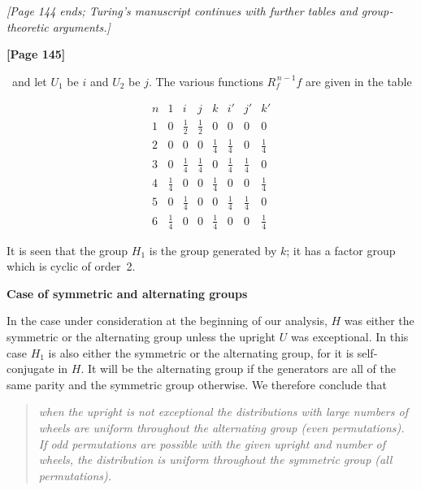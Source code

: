 \documentclass[12pt]{article}
\begin{document}
\bigskip
\noindent
{\em [Page 144 ends; Turing's manuscript continues with further tables and group‐theoretic arguments.]}


\bigskip
\noindent
{\bf [Page 145]}

\medskip

\noindent
\textellipsis\ and let $U_1$ be $i$ and $U_2$ be $j$. The various functions $R_f^{\,n-1}f$ are given in the table

\[
\begin{array}{c|ccccccc}
n & 1 & i & j & k & i' & j' & k' \\ \hline
1 & 0 & \tfrac12 & \tfrac12 & 0 & 0 & 0 & 0 \\
2 & 0 & 0 & 0 & \tfrac14 & \tfrac14 & 0 & \tfrac14 \\
3 & 0 & \tfrac14 & \tfrac14 & 0 & \tfrac14 & \tfrac14 & 0 \\
4 & \tfrac14 & 0 & 0 & \tfrac14 & 0 & 0 & \tfrac14 \\
5 & 0 & \tfrac14 & 0 & 0 & \tfrac14 & \tfrac14 & 0 \\
6 & \tfrac14 & 0 & 0 & \tfrac14 & 0 & 0 & \tfrac14
\end{array}
\]

It is seen that the group $H_1$ is the group generated by $k$; it has a factor group which is cyclic of order~2.

\bigskip

\noindent
{\bf Case of symmetric and alternating groups}

\medskip

In the case under consideration at the beginning of our analysis, $H$ was either the symmetric or the alternating group unless the upright $U$ was exceptional. In this case $H_1$ is also either the symmetric or the alternating group, for it is self‐conjugate in $H$. It will be the alternating group if the generators are all of the same parity and the symmetric group otherwise. We therefore conclude that

\begin{quote}
\emph{when the upright is not exceptional the distributions with large numbers of wheels are uniform throughout the alternating group (even permutations).  
If odd permutations are possible with the given upright and number of wheels, the distribution is uniform throughout the symmetric group (all permutations).}
\end{quote}

\bigskip

\end{document}
